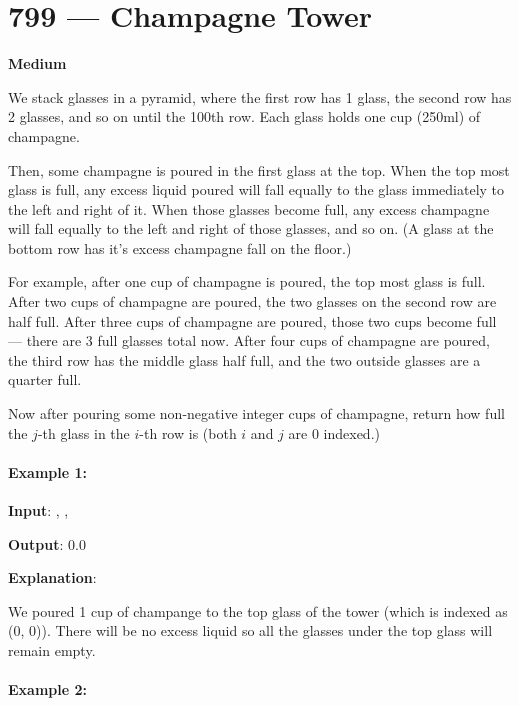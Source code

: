 \section{799 --- Champagne Tower}

\textbf{Medium}

We stack glasses in a pyramid, where the first row has 1 glass, the second row has 2 glasses, and so on until the 100th row.  Each glass holds one cup (250ml) of champagne.

Then, some champagne is poured in the first glass at the top.  When the top most glass is full, any excess liquid poured will fall equally to the glass immediately to the left and right of it.  When those glasses become full, any excess champagne will fall equally to the left and right of those glasses, and so on.  (A glass at the bottom row has it's excess champagne fall on the floor.)

For example, after one cup of champagne is poured, the top most glass is full.  After two cups of champagne are poured, the two glasses on the second row are half full.  After three cups of champagne are poured, those two cups become full --- there are 3 full glasses total now.  After four cups of champagne are poured, the third row has the middle glass half full, and the two outside glasses are a quarter full.


Now after pouring some non-negative integer cups of champagne, return how full the $ j $-th glass in the $ i $-th row is (both $ i $ and $ j $ are 0 indexed.)

\paragraph{Example 1:}

\begin{flushleft}
\textbf{Input}: , , 

\textbf{Output}: 0.0

\textbf{Explanation}: 

We poured 1 cup of champange to the top glass of the tower (which is indexed as (0, 0)). There will be no excess liquid so all the glasses under the top glass will remain empty.
\end{flushleft}

\paragraph{Example 2:}


